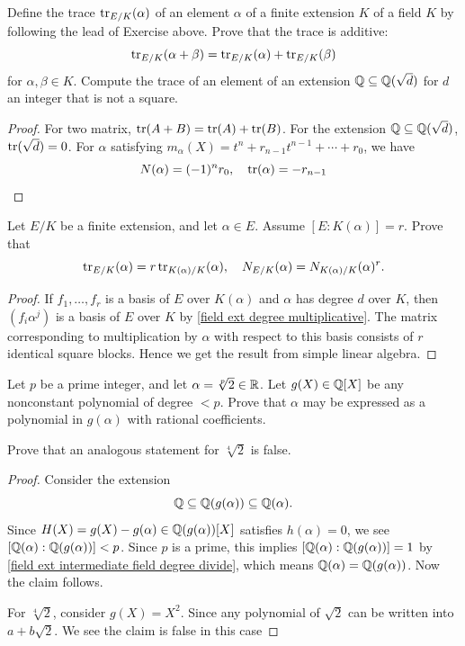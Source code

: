 \begin{exercise}\label{norm trace formula}
Define the trace $\mathrm{tr}_{E/K}(\alpha)$ of an element $\alpha$ of a finite extension $K$ of a field $K$ by following the lead of Exercise above. Prove that the trace is additive:
\[\mathrm{tr}_{E/K}(\alpha+\beta)=\mathrm{tr}_{E/K}(\alpha)+\mathrm{tr}_{E/K}(\beta)\]
for $\alpha,\beta\in K$. Compute the trace of an element of an extension $\mathbb{Q}\subseteq\mathbb{Q}(\sqrt{d})$ for $d$ an integer that is not a square.
\end{exercise}
\begin{proof}
For two matrix, $\mathrm{tr}(A+B)=\mathrm{tr}(A)+\mathrm{tr}(B)$. For the extension $\mathbb{Q}\subseteq\mathbb{Q}(\sqrt{d})$, $\mathrm{tr}(\sqrt{d})=0$.
For $\alpha$ satisfying $m_\alpha(X)=t^n+r_{n-1}t^{n-1}+\cdots+r_0$, we have
\[N(\alpha)=(-1)^nr_0,\quad \mathrm{tr}(\alpha)=-r_{n-1}\]
\end{proof}
\begin{exercise}
Let $E/K$ be a finite extension, and let $\alpha\in E$. Assume $[E:K(\alpha)]=r$. Prove that
\[\mathrm{tr}_{E/K}(\alpha)=r\,\mathrm{tr}_{K(\alpha)/K}(\alpha),\quad N_{E/K}(\alpha)=N_{K(\alpha)/K}(\alpha)^r.\]
\end{exercise}
\begin{proof}
If $f_1,\dots,f_r$ is a basis of $E$ over $K(\alpha)$ and $\alpha$ has degree $d$ over $K$, then $(f_i\alpha^j)$ is a basis of $E$ over $K$ by \cref{field ext degree multiplicative}. The matrix
corresponding to multiplication by $\alpha$ with respect to this basis consists of $r$ identical square blocks. Hence we get the result from simple linear algebra.
\end{proof}
\begin{exercise}
Let $p$ be a prime integer, and let $\alpha=\sqrt[p]{2}\in\mathbb{R}$. Let $g(X)\in\mathbb{Q}[X]$ be any nonconstant
polynomial of degree $<p$. Prove that $\alpha$ may be expressed as a polynomial in $g(\alpha)$ with rational coefficients.\par
Prove that an analogous statement for $\sqrt[4]{2}$ is false.
\end{exercise}
\begin{proof}
Consider the extension
\[\mathbb{Q}\subseteq\mathbb{Q}(g(\alpha))\subseteq\mathbb{Q}(\alpha).\]
Since $H(X)=g(X)-g(\alpha)\in \mathbb{Q}(g(\alpha))[X]$ satisfies $h(\alpha)=0$, we see $[\mathbb{Q}(\alpha):\mathbb{Q}(g(\alpha))]<p$. Since $p$ is a prime, this implies $[\mathbb{Q}(\alpha):\mathbb{Q}(g(\alpha))]=1$ by \cref{field ext intermediate field degree divide}, which means $\mathbb{Q}(\alpha)=\mathbb{Q}(g(\alpha))$. Now the claim follows.\par
For $\sqrt[4]{2}$, consider $g(X)=X^2$. Since any polynomial of $\sqrt{2}$ can be written into $a+b\sqrt{2}$. We see the claim is false in this case
\end{proof}
